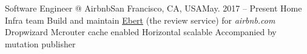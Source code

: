 


\begin{cventries}


\cvindustry
{Software Engineer @ Airbnb}{San Francisco, CA, USA}{May. 2017 -- Present}
{Home Infra team}
{
	\cvindustryitem
	{Build and maintain \underline{Ebert} (the review service) for \emph{airbnb.com}}
	{Dropwizard}
	{{\bullet} Mcrouter cache enabled {\bullet} Horizontal scalable {\bullet} Accompanied by mutation publisher}
}

\end{cventries}
